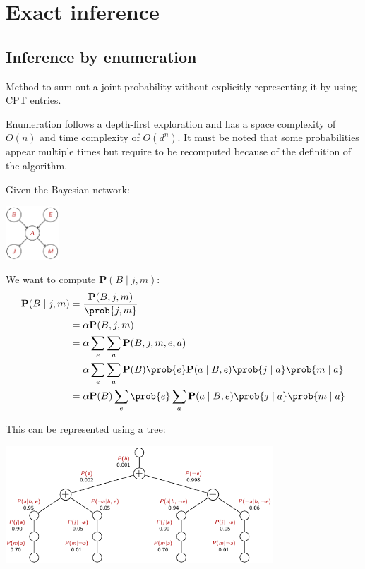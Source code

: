 \chapter{Exact inference}


\section{Inference by enumeration}

Method to sum out a joint probability without explicitly representing it
by using CPT entries.

Enumeration follows a depth-first exploration and has a space complexity of $O(n)$
and time complexity of $O(d^n)$.
It must be noted that some probabilities appear multiple times but 
require to be recomputed because of the definition of the algorithm.

\begin{example}[Burglary]
    Given the Bayesian network:
    \begin{center}
        \includegraphics[width=0.15\textwidth]{img/_burglary_net.pdf}
    \end{center}
    We want to compute $\textbf{P}(B \mid j, m)$:
    \[
        \begin{split}
            \textbf{P}(B \mid j, m) &= \frac{\textbf{P}(B, j, m)}{\prob{j, m}} \\
                &= \alpha \textbf{P}(B, j, m) \\
                &= \alpha \sum_{e} \sum_{a} \textbf{P}(B, j, m, e, a) \\
                &= \alpha \sum_{e} \sum_{a} \textbf{P}(B) \prob{e} \textbf{P}(a \mid B, e) \prob{j \mid a} \prob{m \mid a} \\
                &= \alpha \textbf{P}(B) \sum_{e} \prob{e} \sum_{a} \textbf{P}(a \mid B, e) \prob{j \mid a} \prob{m \mid a} \\
        \end{split}  
    \]

    This can be represented using a tree:
    \begin{center}
        \includegraphics[width=0.75\textwidth]{img/_burglary_enumeration.pdf}
    \end{center}
\end{example}


